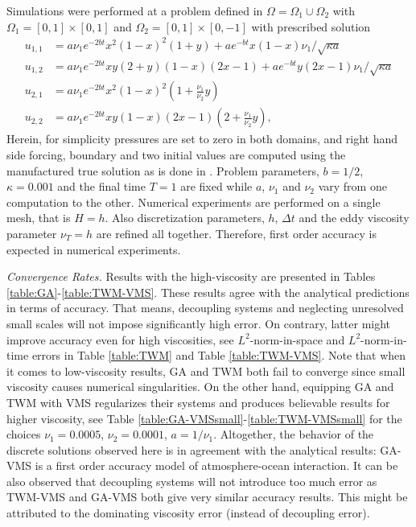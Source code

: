 \documentclass[10pt]{article}%
\numberwithin{equation}{section}
\begin{document}
Simulations were  performed at a problem defined in $\Omega = \Omega_1 \cup \Omega_2$ with $\Omega_1 = [0,1] \times [0,1]$ and $\Omega_2=[0,1] \times [0,-1]$ with prescribed solution
\begin{equation*}
\begin{aligned}
u_{1,1} &= a\nu_1e^{-2bt}x^2(1 - x)^2(1 + y) + ae^{-bt}x(1 - x)\nu_1/\sqrt{\kappa a}\\
u_{1,2} &= a\nu_1e^{-2bt}xy(2 + y)(1 - x)(2x-1) + ae^{-bt}y(2x - 1)\nu_1/\sqrt{\kappa a} \\
u_{2,1} &= a\nu_1 e^{-2bt}x^2(1 - x)^2(1 + \frac{\nu_1}{\nu_2}y) \\
u_{2,2} &= a\nu_1 e^{-2bt}xy(1 - x)(2x - 1)(2 + \frac{\nu_1}{\nu_2}y),
\end{aligned}
\end{equation*}
Herein, for simplicity pressures are set to zero in both domains, and right hand side forcing, boundary and two initial values are computed using the manufactured true solution as is done in \cite{ACEL18}. Problem parameters, $b=1/2$, $\kappa=0.001$ and the final time $T=1$ are fixed while $a$, $\nu_1$ and $\nu_2$ vary from one computation to the other. Numerical experiments are performed on a single mesh, that is $H=h$.  Also discretization parameters, $h$, $\Delta t$ and the eddy viscosity parameter $\nu_T=h$ are refined all together. Therefore, first order accuracy is expected in numerical experiments.


{\it Convergence Rates.} Results with the high-viscosity are presented in Tables \ref{table:GA}-\ref{table:TWM-VMS}. These results agree with the analytical predictions in terms of accuracy. That means, decoupling systems and neglecting unresolved small scales will not impose significantly high error. On contrary, latter might improve accuracy even for high viscosities, see $L^2$-norm-in-space and $L^2$-norm-in-time errors in Table \ref{table:TWM} and Table \ref{table:TWM-VMS}. Note that when it comes to low-viscosity results, GA and TWM both fail to converge since small viscosity causes numerical singularities. On the other hand, equipping GA and TWM with VMS regularizes their systems and produces believable results for higher viscosity, see Table \ref{table:GA-VMSsmall}-\ref{table:TWM-VMSsmall} for the choices $\nu_1 = 0.0005$, $\nu_2 = 0.0001$, $a = 1/\nu_1$. Altogether, the behavior of the discrete solutions observed here is in agreement
with the analytical results: GA-VMS is a first order accuracy model of atmosphere-ocean interaction. It can be also observed that decoupling systems will not introduce too much error as TWM-VMS and GA-VMS both give very similar accuracy results. This might be attributed to the dominating viscosity error (instead of decoupling error).
\end{document}
